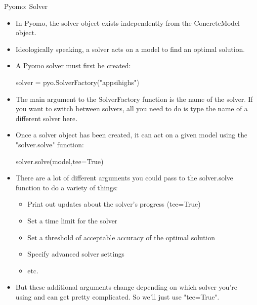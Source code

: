 \documentclass[10pt, aspectratio=169]{beamer}
\begin{document}
\begin{frame}{Pyomo: Solver}
    \begin{itemize}
        \item In Pyomo, the solver object exists independently from the ConcreteModel object.
        \item Ideologically speaking, a solver acts on a model to find an optimal solution.
        \item A Pyomo solver must first be created:
        
        \hspace{0.25cm} solver = pyo.SolverFactory("appsi\textunderscore highs")

        \item The main argument to the SolverFactory function is the name of the solver. If you want to switch between solvers, all you need to do is type the name of a different solver here.
        \item Once a solver object has been created, it can act on a given model using the "solver.solve" function:
        
        \hspace{0.25cm} solver.solve(model,tee=True)

        \item There are a lot of different arguments you could pass to the solver.solve function to do a variety of things:
        \begin{itemize}
            \item Print out updates about the solver's progress (tee=True)
            \item Set a time limit for the solver
            \item Set a threshold of acceptable accuracy of the optimal solution
            \item Specify advanced solver settings
            \item etc.
        \end{itemize}
        \item But these additional arguments change depending on which solver you're using and can get pretty complicated. So we'll just use "tee=True".
    \end{itemize}
\end{frame}
\end{document}
